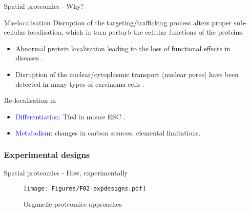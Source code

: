\begin{frame}{Spatial proteomics - Why?}
  \begin{block}{Mis-localisation}   
    Disruption of the targeting/trafficking process alters proper
    sub-cellular localisation, which in turn perturb the cellular
    functions of the proteins.  
    \begin{itemize}
    \item Abnormal protein localisation leading to the loss of functional
      effects in diseases \citep{Laurila2009}.    
    \item Disruption of the nuclear/cytoplasmic transport (nuclear
      pores) have been detected in many types of carcinoma cells
      \citep{Kau2004}.
    \end{itemize}      
  \end{block}

  \begin{block}{Re-localisation in} 
    \begin{itemize}
    \item \textcolor{Blue}{Differentiation}: Tfe3 in mouse ESC
      \citep{Betschinger:2013}.
    \item \textcolor{Blue}{Metabolism}: changes in carbon sources, elemental
      limitations.
    \end{itemize}
  \end{block}

\end{frame}


\subsubsection*{Experimental designs}
\label{sec:expdesign}

\begin{frame}{Spatial proteomics - How, experimentally}
  \begin{figure}
    \texttt{[image: Figures/F02-expdesigns.pdf]}
    \caption{Organelle proteomics approaches \citep{Gatto:2010}}
  \end{figure}
\end{frame}


